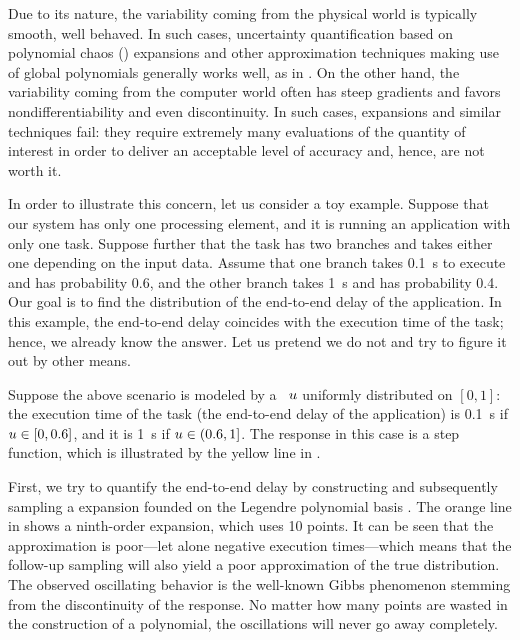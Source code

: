 
Due to its nature, the variability coming from the physical world is typically
smooth, well behaved. In such cases, uncertainty quantification based on
polynomial chaos () expansions \cite{xiu2010} and other approximation
techniques making use of global polynomials generally works well, as in
\cite{bhardwaj2008, lee2013, ukhov2014, ukhov2015}. On the other hand, the
variability coming from the computer world often has steep gradients and favors
nondifferentiability and even discontinuity. In such cases,  expansions
and similar techniques fail: they require extremely many evaluations of the
quantity of interest in order to deliver an acceptable level of accuracy and,
hence, are not worth it.

In order to illustrate this concern, let us consider a toy example. Suppose that
our system has only one processing element, and it is running an application
with only one task. Suppose further that the task has two branches and takes
either one depending on the input data. Assume that one branch takes 0.1~s to
execute and has probability 0.6, and the other branch takes 1~s and has
probability 0.4. Our goal is to find the distribution of the end-to-end delay of
the application. In this example, the end-to-end delay coincides with the
execution time of the task; hence, we already know the answer. Let us pretend we
do not and try to figure it out by other means.

Suppose the above scenario is modeled by a \rv\ $u$ uniformly distributed on
$[0, 1]$: the execution time of the task (the end-to-end delay of the
application) is 0.1~s if $u \in [0, 0.6]$, and it is 1~s if $u \in (0.6, 1]$.
The response in this case is a step function, which is illustrated by the yellow
line in .

First, we try to quantify the end-to-end delay by constructing and subsequently
sampling a  expansion founded on the Legendre polynomial basis
\cite{xiu2010}. The orange line in  shows a ninth-order 
expansion, which uses 10 points. It can be seen that the approximation is
poor---let alone negative execution times---which means that the follow-up
sampling will also yield a poor approximation of the true distribution. The
observed oscillating behavior is the well-known Gibbs phenomenon stemming from
the discontinuity of the response. No matter how many points are wasted in the
construction of a polynomial, the oscillations will never go away completely.

